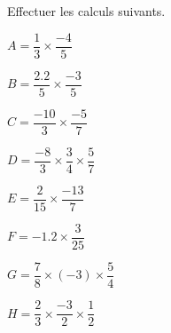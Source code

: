 \begin{exercice*}
    Effectuer les calculs suivants.

    \hspace*{-10mm}
    \begin{minipage}{\linewidth}
        \begin{spacing}{2}
            \begin{multicols}{2}
                \begin{list}{}{}                
                    \item $A=\dfrac{1}{3}\times\dfrac{-4}{5}$
                    \item $B=\dfrac{\num{2.2}}{5}\times\dfrac{-3}{5}$
                    \item $C=\dfrac{-10}{3}\times\dfrac{-5}{7}$
                    \item $D=\dfrac{-8}{3}\times\dfrac{3}{4}\times\dfrac{5}{7}$
                    \item $E=\dfrac{2}{15}\times\dfrac{-13}{7}$
                    \item $F=\num{-1.2}\times\dfrac{3}{25}$
                    \item $G=\dfrac{7}{8}\times (-3)\times\dfrac{5}{4}$
                    \item $H=\dfrac{2}{3}\times\dfrac{-3}{2}\times\dfrac{1}{2}$
                \end{list}
            \end{multicols}
        \end{spacing}
    \end{minipage}
\end{exercice*}
